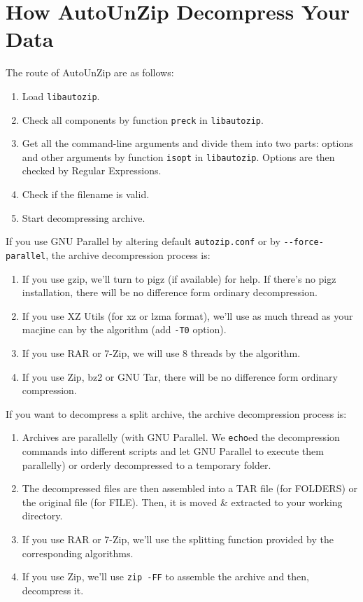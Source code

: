\documentclass[fleqn,10pt]{SelfArx} %
\begin{document}
\section{How AutoUnZip Decompress Your Data}
The route of AutoUnZip are as follows:
\begin{enumerate}
\item Load \verb|libautozip|.
\item Check all components by function \verb|preck| in \verb|libautozip|.
\item Get all the command-line arguments and divide them into two parts: options and other arguments by function \verb|isopt| in \verb|libautozip|. Options are then checked by Regular Expressions.
\item Check if the filename is valid.
\item Start decompressing archive.
\end{enumerate}
If you use GNU Parallel by altering default \verb|autozip.conf| or by \verb|--force-parallel|, the archive decompression process is:
\begin{enumerate}
\item If you use gzip, we'll turn to pigz (if available) for help. If there's no pigz installation, there will be no difference form ordinary decompression.
\item If you use XZ Utils (for xz or lzma format), we'll use as much thread as your macjine can by the algorithm (add \verb|-T0| option).
\item If you use RAR or 7-Zip, we will use 8 threads by the algorithm.
\item If you use Zip, bz2 or GNU Tar, there will be no difference form ordinary compression.
\end{enumerate}
If you want to decompress a split archive, the archive decompression process is:
\begin{enumerate}
\item Archives are parallelly (with GNU Parallel. We \verb|echo|ed the decompression commands into different scripts and let GNU Parallel to execute them parallelly) or orderly decompressed to a temporary folder.
\item The decompressed files are then assembled into a TAR file (for FOLDERS) or the original file (for FILE). Then, it is moved \& extracted to your working directory.
\item If you use RAR or 7-Zip, we'll use the splitting function provided by the corresponding algorithms.
\item If you use Zip, we'll use \verb|zip -FF| to assemble the archive and then, decompress it.
\end{enumerate}
\end{document}
